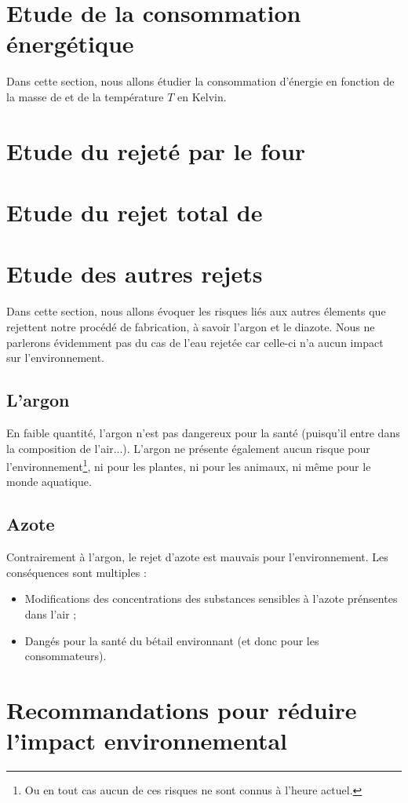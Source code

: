 
\section{Etude de  la consommation énergétique}
Dans cette section, nous allons étudier la 
consommation d'énergie en fonction de la
masse de  et de la température $T$
en Kelvin.
\section{Etude du  rejeté par le four}
\section{Etude du rejet total de }
\section{Etude des autres rejets}
Dans cette section, nous allons
évoquer les risques liés aux autres 
élements que rejettent notre procédé
de fabrication, à savoir l'argon et
le diazote. Nous ne parlerons
évidemment pas du cas de l'eau 
rejetée car celle-ci n'a aucun impact
sur l'environnement.
\subsection{L'argon}
En faible quantité, l'argon n'est
pas dangereux pour la santé (puisqu'il
entre dans la composition de l'air...).
L'argon ne présente également aucun risque
pour l'environnement\footnote{Ou en tout
cas aucun de ces risques ne sont connus
à l'heure actuel.}, ni pour les plantes, 
ni pour les animaux, ni même pour le monde
aquatique.
\subsection{Azote}
Contrairement à l'argon, le rejet 
d'azote est mauvais pour l'environnement.
Les conséquences sont multiples :
\begin{itemize}
	\item Modifications des concentrations
	des substances sensibles à l'azote
	prénsentes dans l'air ;
	\item Dangés pour la santé du bétail
	environnant (et donc pour les consommateurs).
\end{itemize}

\section{Recommandations pour réduire
l'impact environnemental}

